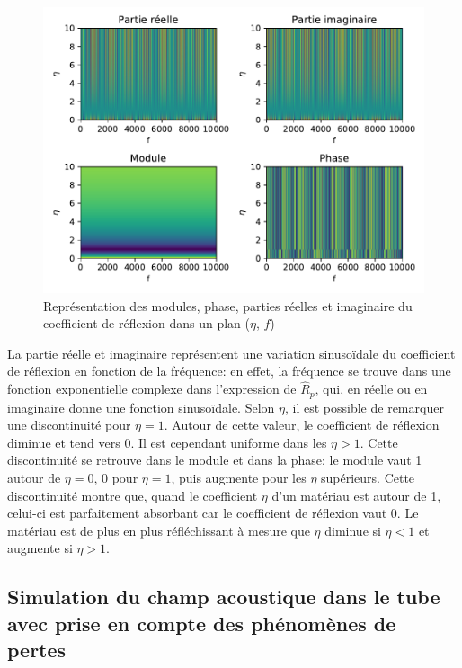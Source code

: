 \documentclass[a4paper, 11pt]{article}
\begin{document}
\begin{figure}[H]
	\centering 
	\includegraphics[width=\linewidth]{Figures/coef_refl.pdf}
	\caption{Représentation des modules, phase, parties réelles et imaginaire du coefficient de réflexion dans un plan ($\eta$, $f$)}
	\label{fig:coef_refl}
\end{figure}

La partie réelle et imaginaire représentent une variation sinusoïdale du coefficient de réflexion en fonction de la fréquence: en effet, la fréquence se trouve dans une fonction exponentielle complexe dans l'expression de $\hat{R}_p$, qui, en réelle ou en imaginaire donne une fonction sinusoïdale. Selon $\eta$, il est possible de remarquer une discontinuité pour $\eta = 1$. Autour de cette valeur, le coefficient de réflexion diminue et tend vers 0. Il est cependant uniforme dans les $\eta > 1$. Cette discontinuité se retrouve dans le module et dans la phase: le module vaut 1 autour de $\eta = 0$, 0 pour $\eta = 1$, puis augmente pour les $\eta$ supérieurs. Cette discontinuité montre que, quand le coefficient $\eta$ d'un matériau est autour de 1, celui-ci est parfaitement absorbant car le coefficient de réflexion vaut 0. Le matériau est de plus en plus réfléchissant à mesure que $\eta$ diminue si $\eta < 1$ et augmente si $\eta > 1$.  

\subsection{Simulation du champ acoustique dans le tube avec prise en compte des phénomènes de pertes}
\end{document}
